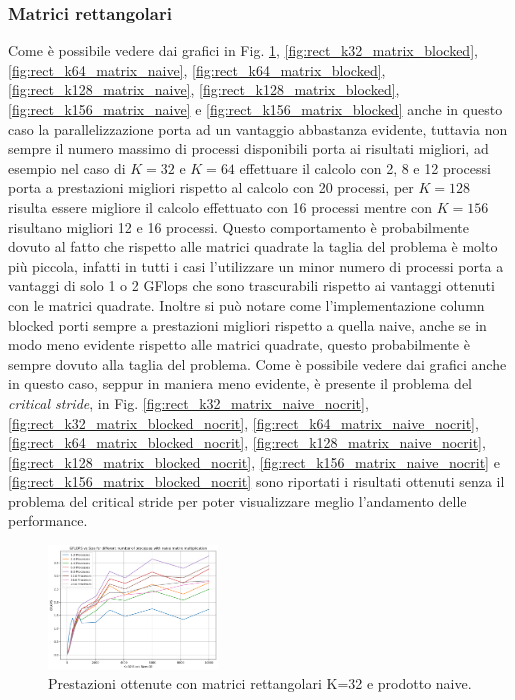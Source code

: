 \documentclass[conference]{IEEEtran}
\begin{document}
\subsubsection{Matrici rettangolari}
Come è possibile vedere dai grafici in Fig. \ref{fig:rect_k32_matrix_naive}, \ref{fig:rect_k32_matrix_blocked}, \ref{fig:rect_k64_matrix_naive}, \ref{fig:rect_k64_matrix_blocked}, \ref{fig:rect_k128_matrix_naive}, \ref{fig:rect_k128_matrix_blocked}, \ref{fig:rect_k156_matrix_naive} e \ref{fig:rect_k156_matrix_blocked} anche in questo caso la parallelizzazione porta ad un vantaggio abbastanza evidente, tuttavia non sempre il numero massimo di processi disponibili porta ai risultati migliori, ad esempio nel caso di $K=32$ e $K=64$ effettuare il calcolo con 2, 8 e 12 processi porta a prestazioni migliori rispetto al calcolo con 20 processi, per $K=128$ risulta essere migliore il calcolo effettuato con 16 processi mentre con $K=156$ risultano migliori 12 e 16 processi. Questo comportamento è probabilmente dovuto al fatto che rispetto alle matrici quadrate la taglia del problema è molto più piccola, infatti in tutti i casi l'utilizzare un minor numero di processi porta a vantaggi di solo 1 o 2 GFlops che sono trascurabili rispetto ai vantaggi ottenuti con le matrici quadrate. Inoltre si può notare come l'implementazione column blocked porti sempre a prestazioni migliori rispetto a quella naive, anche se in modo meno evidente rispetto alle matrici quadrate, questo probabilmente è sempre dovuto alla taglia del problema.
Come è possibile vedere dai grafici anche in questo caso, seppur in maniera meno evidente, è presente il problema del \textit{critical stride}, in Fig. \ref{fig:rect_k32_matrix_naive_nocrit}, \ref{fig:rect_k32_matrix_blocked_nocrit}, \ref{fig:rect_k64_matrix_naive_nocrit}, \ref{fig:rect_k64_matrix_blocked_nocrit}, \ref{fig:rect_k128_matrix_naive_nocrit}, \ref{fig:rect_k128_matrix_blocked_nocrit}, \ref{fig:rect_k156_matrix_naive_nocrit} e \ref{fig:rect_k156_matrix_blocked_nocrit} sono riportati i risultati ottenuti senza il problema del critical stride per poter visualizzare meglio l'andamento delle performance.
\begin{figure}[H]
    \centering
    \includegraphics[width=0.4\textwidth]{resources/rettangolari_k32_naive.png}
    \caption{Prestazioni ottenute con matrici rettangolari K=32 e prodotto naive.}
    \label{fig:rect_k32_matrix_naive}
\end{figure}
\end{document}
